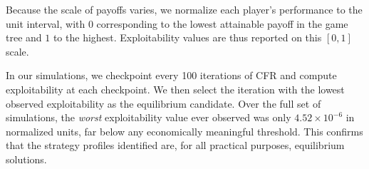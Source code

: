 \documentclass{article}
\begin{document}
Because the scale of payoffs varies, we normalize each player’s performance to 
the unit interval, with $0$ corresponding to the lowest attainable payoff in the 
game tree and $1$ to the highest. Exploitability values are thus reported on this 
$[0,1]$ scale. 

In our simulations, we checkpoint every 100 iterations of CFR and compute 
exploitability at each checkpoint. We then select the iteration with the lowest 
observed exploitability as the equilibrium candidate. Over the full set of 
simulations, the \emph{worst} exploitability value ever observed was only 
$4.52 \times 10^{-6}$ in normalized units, far below any economically meaningful 
threshold. This confirms that the strategy profiles identified are, for all 
practical purposes, equilibrium solutions.


\printbibliography
\end{document}

